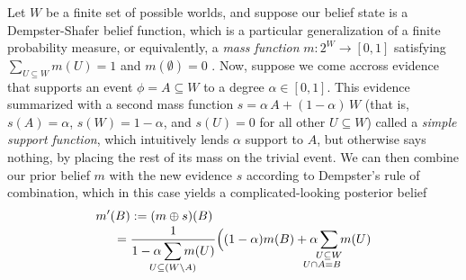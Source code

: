 \begin{example} \label{ex:shafer}
Let $W$ be a finite set of possible worlds, 
and suppose our belief state is a Dempster-Shafer belief function, 
which is a particular generalization of a finite probability measure,
or equivalently, a
\emph{mass function} $m : 2^W \! \to\! [0,1]$
satisfying $\sum_{U \subseteq W} m(U) \!=\! 1$ 
and $m(\emptyset) \!=\! 0$
\parencite{shafer1976mathematical}.
%
Now, suppose we come accross evidence that supports an event $\phi = A
\subseteq W$ to a degree $\alpha \in [0,1]$. This evidence summarized
with 
a second mass function $s = \alpha\, A + (1-\alpha)\,  W$
(that is, $s(A) = \alpha$, $s(W) = 1-\alpha$, and $s(U) = 0$ for all other $U \subseteq W$)
called a \emph{simple support function}, which 
intuitively lends $\alpha$ support to $A$, but otherwise
says nothing, by placing the rest of its mass on the trivial event.
We can then combine our prior belief $m$ with the new evidence $s$
according to Dempster's rule of combination, 
which in this case yields 
a complicated-looking posterior belief 
\begin{align*}
	m'(B) &:= (m \oplus s)(B) \\[-0.5ex]
	=\;&
	\frac{1}{\displaystyle 1 - \alpha \sum_{\mathclap{U \subseteq (W \setminus A)}} m(U)}
	\Big(
	(1-\alpha) m(B) + 
	\alpha \sum_{\substack{\mathclap{U \subseteq W} \\ \mathllap{U \cap A} = \mathrlap{B}}} m(U) 

\end{align*}
\end{example}
